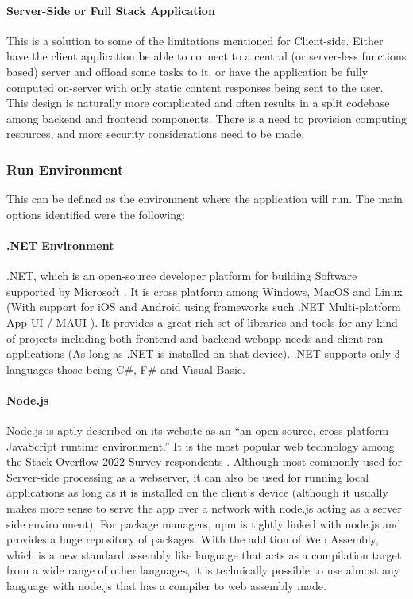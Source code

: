 \paragraph{Server-Side or Full Stack Application}
This is a solution to some of the limitations mentioned for Client-side. Either have the client application be able to connect to a central (or server-less functions based) server and offload some tasks to it, or have the application be fully computed on-server with only static content responses being sent to the user. This design is naturally more complicated and often results in a split codebase among backend and frontend components. There is a need to provision computing resources, and more security considerations need to be made.

\subsubsection{Run Environment}
This can be defined as the environment where the application will run. The main options identified were the following:

\paragraph{.NET Environment}
.NET, which is an open-source developer platform for building Software supported by Microsoft \cite[]{microsoft_what}. It is cross platform among Windows, MacOS and Linux (With support for iOS and Android using frameworks such .NET Multi-platform App UI / MAUI \cite[]{davidbritch_what}). It provides a great rich set of libraries and tools for any kind of projects including both frontend and backend webapp needs and client ran applications (As long as .NET is installed on that device). .NET supports only 3 languages those being C\#, F\# and Visual Basic.

\paragraph{Node.js}
Node.js is aptly described on its website as an “an open-source, cross-platform JavaScript runtime environment.” \cite[]{nodejs_nodejs} It is the most popular web technology among the Stack Overflow 2022 Survey respondents \cite[]{stackoverflow_2021_stack}. Although most commonly used for Server-side processing as a webserver, it can also be used for running local applications as long as it is installed on the client’s device (although it usually makes more sense to serve the app over a network with node.js acting as a server side environment). For package managers, npm is tightly linked with node.js and provides a huge repository of packages. With the addition of Web Assembly, which is a new standard assembly like language that acts as a compilation target from a wide range of other languages, it is technically possible to use almost any language with node.js that has a compiler to web assembly made. \cite[]{webassembly}


